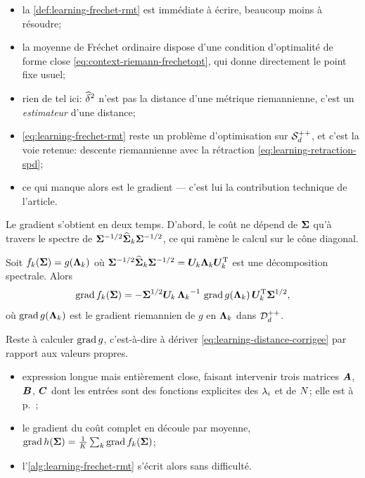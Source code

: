\begin{remark}
\label{rem:learning-substitution-couteuse}
  \begin{itemize}
    \item la \cref{def:learning-frechet-rmt} est immédiate à écrire, beaucoup
      moins à résoudre;
    \item la moyenne de Fréchet ordinaire dispose d'une condition d'optimalité
      de forme close \cref{eq:context-riemann-frechetopt}, qui donne
      directement le point fixe usuel;
    \item rien de tel ici: $\widehat{\delta}^2$ n'est pas la distance d'une métrique
      riemannienne, c'est un \emph{estimateur} d'une distance;
    \item \cref{eq:learning-frechet-rmt} reste un problème d'optimisation sur
      $\mathcal{S}_{d}^{++}$, et c'est la voie retenue: descente riemannienne avec la
      rétraction \cref{eq:learning-retraction-spd};
    \item ce qui manque alors est le gradient --- c'est lui la contribution
      technique de l'article.
  \end{itemize}
  \leavevmode
\end{remark}

Le gradient s'obtient en deux temps. D'abord, le coût ne dépend de $\boldsymbol{\Sigma}$ qu'à
travers le spectre de $\boldsymbol{\Sigma}^{-1/2}\widehat{\boldsymbol{\Sigma}}_k\boldsymbol{\Sigma}^{-1/2}$, ce qui ramène le
calcul sur le cône diagonal.

\begin{proposition}
\label{prop:learning-gradient-reduction}
  Soit $f_k(\boldsymbol{\Sigma})=g(\boldsymbol{\Lambda}_k)$ où
  $\boldsymbol{\Sigma}^{-1/2}\widehat{\boldsymbol{\Sigma}}_k\boldsymbol{\Sigma}^{-1/2}=\boldsymbol{U}_k\boldsymbol{\Lambda}_k\boldsymbol{U}_k^{\mathrm{T}}$
  est une décomposition spectrale. Alors
  \begin{equation}
    \operatorname{\operatorname{grad}} f_k(\boldsymbol{\Sigma})
    =
    -\boldsymbol{\Sigma}^{1/2}\boldsymbol{U}_k\,
    {\boldsymbol{\Lambda}_k}^{-1}\,\operatorname{\operatorname{grad}} g(\boldsymbol{\Lambda}_k)\,
    \boldsymbol{U}_k^{\mathrm{T}}\boldsymbol{\Sigma}^{1/2},
    \label{eq:learning-gradient-reduction}
  \end{equation}
  où $\operatorname{\operatorname{grad}} g(\boldsymbol{\Lambda}_k)$ est le gradient riemannien de $g$ en
  $\boldsymbol{\Lambda}_k$ dans $\mathcal{D}_{d}^{++}$.
\end{proposition}

Reste à calculer $\operatorname{\operatorname{grad}} g$, c'est-à-dire à dériver
\cref{eq:learning-distance-corrigee} par rapport aux valeurs propres.
\begin{itemize}
  \item expression longue mais entièrement close, faisant intervenir trois
    matrices $\boldsymbol{A}$, $\boldsymbol{B}$, $\boldsymbol{C}$ dont les entrées sont des
    fonctions explicites des $\lambda_i$ et de $N$; elle est à
    p.~;
  \item le gradient du coût complet en découle par moyenne,
    $\operatorname{\operatorname{grad}} h(\boldsymbol{\Sigma})=\frac{1}{K}\sum_k\operatorname{\operatorname{grad}} f_k(\boldsymbol{\Sigma})$;
  \item l'\cref{alg:learning-frechet-rmt} s'écrit alors sans difficulté.
\end{itemize}

